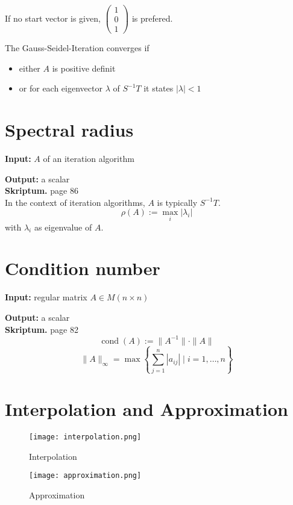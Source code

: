 \documentclass[a4paper,twocolumn]{article}
\newcommand{\io}[2]{{\par\noindent\textbf{Input:} #1 \\}{\textbf{Output:} #2 \\}}
\newcommand{\wa}[1]{\textbf{Wolframalpha:} $#1$ \\}
\newcommand{\scriptref}[1]{\textbf{Skriptum.} page #1 \\}
\begin{document}
If no start vector is given, $\begin{pmatrix} 1 \\ 0 \\ 1 \end{pmatrix}$ is
prefered.

The Gauss-Seidel-Iteration converges if
\begin{itemize}
  \item either $A$ is positive definit
  \item or for each eigenvector $\lambda$ of $S^{-1} T$
        it states $|\lambda| < 1$
\end{itemize}

\section{Spectral radius}

\io{$A$ of an iteration algorithm}{a scalar}
\scriptref{86}

In the context of iteration algorithms, $A$ is typically
$S^{-1}T$.
%
\[
    \rho(A) := \max_i{|\lambda_i|}
\]
%
with $\lambda_i$ as eigenvalue of $A$.

\section{Condition number}

\io{regular matrix $A \in M(n\times n)$}{a scalar}
\scriptref{82}

\[
    \operatorname{cond}(A) := \|A^{-1}\| \cdot \|A\|
\] \[
    \|A\|_\infty = \max{\left\{
        \sum_{j=1}^n |a_{ij}|  \mid i = 1,\ldots,n
    \right\}}
\]

\section{Interpolation and Approximation}

\begin{figure}[h]
  \begin{center}
    \texttt{[image: interpolation.png]}
    \caption{Interpolation}
    \label{fig:interpolation}
  \end{center}
\end{figure}
\begin{figure}[h]
  \begin{center}
    \texttt{[image: approximation.png]}
    \caption{Approximation}
    \label{fig:approximation}
  \end{center}
\end{figure}
\end{document}
